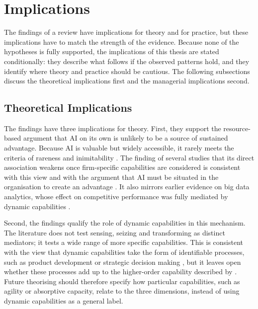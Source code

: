 \section{Implications}
\label{sec:implications}

The findings of a review have implications for theory and for practice, but these implications have to match the strength of the evidence. Because none of the hypotheses is fully supported, the implications of this thesis are stated conditionally: they describe what follows if the observed patterns hold, and they identify where theory and practice should be cautious. The following subsections discuss the theoretical implications first and the managerial implications second.

\subsection{Theoretical Implications}
\label{sec:theoryimp}

The findings have three implications for theory. First, they support the resource-based argument that AI on its own is unlikely to be a source of sustained advantage. Because AI is valuable but widely accessible, it rarely meets the criteria of rareness and inimitability \parencite{barney1991}. The finding of several studies that its direct association weakens once firm-specific capabilities are considered is consistent with this view and with the argument that AI must be situated in the organisation to create an advantage \parencite{kemp2024}. It also mirrors earlier evidence on big data analytics, whose effect on competitive performance was fully mediated by dynamic capabilities \parencite{mikalef2020}.

Second, the findings qualify the role of dynamic capabilities in this mechanism. The literature does not test sensing, seizing and transforming as distinct mediators; it tests a wide range of more specific capabilities. This is consistent with the view that dynamic capabilities take the form of identifiable processes, such as product development or strategic decision making \parencite{eisenhardt2000}, but it leaves open whether these processes add up to the higher-order capability described by \textcite{teece2007}. Future theorising should therefore specify how particular capabilities, such as agility or absorptive capacity, relate to the three dimensions, instead of using dynamic capabilities as a general label.

